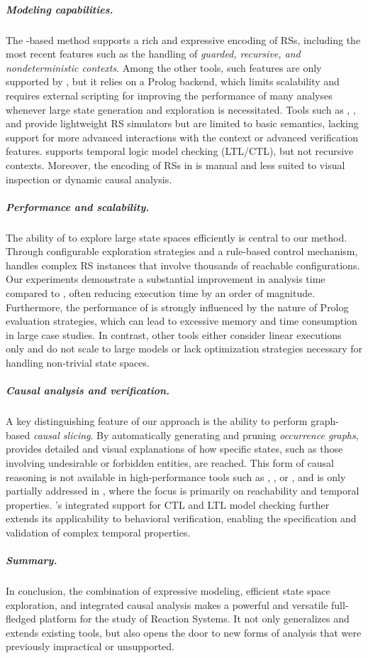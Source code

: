 \subparagraph*{Modeling capabilities.}
The \GROOVE-based method supports a rich and expressive encoding of RSs, including the most recent features such as the handling of \emph{guarded, recursive, and nondeterministic contexts}.
Among the other tools, such features are only supported by \BioResolve, but it relies on a Prolog backend, which limits scalability and requires external scripting for improving the performance of many analyses whenever large state generation and exploration is necessitated. Tools such as \HERESY, \WebRSim, and \clrs provide lightweight RS simulators but are limited to basic semantics, lacking support for more advanced interactions with the context or advanced verification features. \ccReact supports temporal logic model checking (LTL/CTL), but not recursive contexts. Moreover, the encoding of RSs in \ccReact is manual and less suited to visual inspection or dynamic causal analysis.

\subparagraph*{Performance and scalability.}
The ability of \GROOVE to explore large state spaces efficiently is central to our method. Through configurable exploration strategies and a rule-based control mechanism, \GROOVE handles complex RS instances that involve thousands of reachable configurations. Our experiments demonstrate a substantial improvement in analysis time compared to \BioResolve, often reducing execution time by an order of magnitude. Furthermore, the performance of \BioResolve is strongly influenced by the nature of Prolog evaluation strategies, which can lead to excessive memory and time consumption in large case studies.
In contrast, other tools either consider linear executions only and do not scale to large models or lack optimization strategies necessary for handling non-trivial state spaces. 

\subparagraph*{Causal analysis and verification.}
A key distinguishing feature of our approach is the ability to perform graph-based \emph{causal slicing}. By automatically generating and pruning \emph{occurrence graphs}, \GROOVE provides detailed and visual explanations of how specific states, such as those involving undesirable or forbidden entities, are reached.
This form of causal reasoning is not available in high-performance tools such as \HERESY, \WebRSim, or \clrs, and is only partially addressed in \ccReact, where the focus is primarily on reachability and temporal properties. 
\GROOVE's integrated support for CTL and LTL model checking further extends its applicability to behavioral verification, enabling the specification and validation of complex temporal properties. 

\subparagraph*{Summary.}
In conclusion, the combination of expressive modeling, efficient state space exploration, and integrated causal analysis makes \GROOVE a powerful and versatile full-fledged platform for the study of Reaction Systems. It not only generalizes and extends existing tools, but also opens the door to new forms of analysis that were previously impractical or unsupported.










